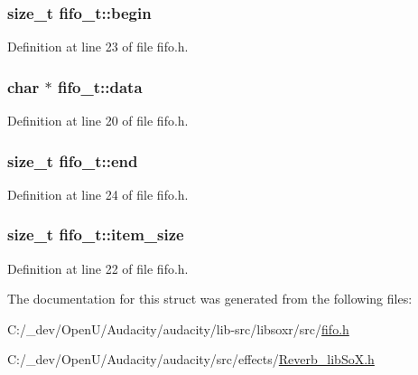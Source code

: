 \subsubsection[{\texorpdfstring{begin}{begin}}]{\setlength{\rightskip}{0pt plus 5cm}size\+\_\+t fifo\+\_\+t\+::begin}\hypertarget{structfifo__t_a79f37cde2567dd47b74429ba81d33a5b}{}\label{structfifo__t_a79f37cde2567dd47b74429ba81d33a5b}


Definition at line 23 of file fifo.\+h.

\subsubsection[{\texorpdfstring{data}{data}}]{\setlength{\rightskip}{0pt plus 5cm}char $\ast$ fifo\+\_\+t\+::data}\hypertarget{structfifo__t_ad806607da2ce373d1ad2e25691a9d069}{}\label{structfifo__t_ad806607da2ce373d1ad2e25691a9d069}


Definition at line 20 of file fifo.\+h.

\subsubsection[{\texorpdfstring{end}{end}}]{\setlength{\rightskip}{0pt plus 5cm}size\+\_\+t fifo\+\_\+t\+::end}\hypertarget{structfifo__t_aacc38be66356863026eb2cf5e646526d}{}\label{structfifo__t_aacc38be66356863026eb2cf5e646526d}


Definition at line 24 of file fifo.\+h.

\subsubsection[{\texorpdfstring{item\+\_\+size}{item_size}}]{\setlength{\rightskip}{0pt plus 5cm}size\+\_\+t fifo\+\_\+t\+::item\+\_\+size}\hypertarget{structfifo__t_a9e7b35c08422599daaf97bfc31d7a2a5}{}\label{structfifo__t_a9e7b35c08422599daaf97bfc31d7a2a5}


Definition at line 22 of file fifo.\+h.



The documentation for this struct was generated from the following files\+:\begin{DoxyCompactItemize}
\item 
C\+:/\+\_\+dev/\+Open\+U/\+Audacity/audacity/lib-\/src/libsoxr/src/\hyperlink{libsoxr_2src_2fifo_8h}{fifo.\+h}\item 
C\+:/\+\_\+dev/\+Open\+U/\+Audacity/audacity/src/effects/\hyperlink{_reverb__lib_so_x_8h}{Reverb\+\_\+lib\+So\+X.\+h}\end{DoxyCompactItemize}
